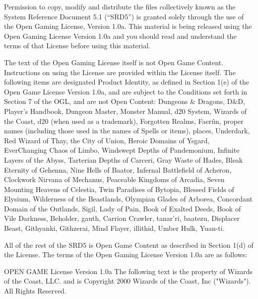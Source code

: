 \documentclass[a4paper,11pt,twoside,openany]{book}
\begin{document}
{{\scriptsize Permission to copy, modify and distribute the files collectively known as the System Reference Document 5.1 (“SRD5”) is granted solely through the use of the Open Gaming License, Version 1.0a. This material is being released using the Open Gaming License Version 1.0a and you should read and understand the terms of that License before using this material.

The text of the Open Gaming License itself is not Open Game Content. Instructions on using the License are provided within the License itself. The following items are designated Product Identity, as defined in Section 1(e) of the Open Game License Version 1.0a, and are subject to the Conditions set forth in Section 7 of the OGL, and are not Open Content: Dungeons \& Dragons, D\&D, Player’s Handbook, Dungeon Master, Monster Manual, d20 System, Wizards of the Coast, d20 (when used as a trademark), Forgotten Realms, Faerûn, proper names (including those used in the names of Spells or items), places, Underdark, Red Wizard of Thay, the City of Union, Heroic Domains of Ysgard, EverChanging Chaos of Limbo, Windswept Depths of Pandemonium, Infinite Layers of the Abyss, Tarterian Depths of Carceri, Gray Waste of Hades, Bleak Eternity of Gehenna, Nine Hells of Baator, Infernal Battlefield of Acheron, Clockwork Nirvana of Mechanus, Peaceable Kingdoms of Arcadia, Seven Mounting Heavens of Celestia, Twin Paradises of Bytopia, Blessed Fields of Elysium, Wilderness of the Beastlands, Olympian Glades of Arborea, Concordant Domain of the Outlands, Sigil, Lady of Pain, Book of Exalted Deeds, Book of Vile Darkness, Beholder, gauth, Carrion Crawler, tanar’ri, baatezu, Displacer Beast, Githyanki, Githzerai, Mind Flayer, illithid, Umber Hulk, Yuan-ti.

All of the rest of the SRD5 is Open Game Content as described in Section 1(d) of the License. The terms of the Open Gaming License Version 1.0a are as follows:

OPEN GAME License Version 1.0a The following text is the property of Wizards of the Coast, LLC. and is Copyright 2000 Wizards of the Coast, Inc ("Wizards"). All Rights Reserved.

}}
\end{document}
